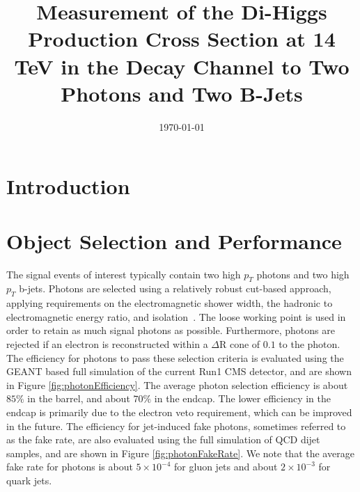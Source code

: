 \documentclass{cmspaper}
\begin{document}
\begin{titlepage}


  \date{\today}

  \title{Measurement of the Di-Higgs Production Cross Section at 14 TeV in the Decay Channel to Two Photons and Two B-Jets}

   

  \begin{abstract}

  \end{abstract} 

\end{titlepage}
\tableofcontents
\newpage 

\section{Introduction}
  \label{sec:intro}

\section{Object Selection and Performance}
\label{sec:objects}

The signal events of interest typically contain two high $p_{T}$ photons and two high $p_{T}$ b-jets. 
Photons are selected using a relatively robust cut-based approach, applying requirements on the
electromagnetic shower width, the hadronic to electromagnetic energy ratio, and isolation~\cite{CMS-DP-2013-010}.
The loose working point is used in order to retain as much signal photons as possible. Furthermore, photons are rejected
if an electron is reconstructed within a $\Delta$R cone of $0.1$ to the photon. The efficiency for photons to pass
these selection criteria is evaluated using the GEANT based full simulation of the current Run1 CMS detector, 
and are shown in Figure \ref{fig:photonEfficiency}. The average photon selection efficiency is 
about $85\%$ in the barrel, and about $70\%$ in the endcap. The lower efficiency in the endcap 
is primarily due to the electron veto requirement, which
can be improved in the future. The efficiency for jet-induced fake photons, sometimes referred to as the fake rate,
are also evaluated using the full simulation of QCD dijet samples, and are shown in Figure \ref{fig:photonFakeRate}. 
We note that the average fake rate for photons is about $5 \times 10^{-4}$ for gluon jets and 
about $2\times 10^{-3}$ for quark jets.
\end{document}
